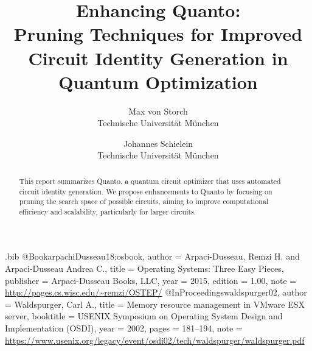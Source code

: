 \renewcommand\theadfont{\bfseries}

\usepackage{filecontents}

\begin{filecontents}{\jobname.bib}
@Book{arpachiDusseau18:osbook,
  author =       {Arpaci-Dusseau, Remzi H. and Arpaci-Dusseau Andrea C.},
  title =        {Operating Systems: Three Easy Pieces},
  publisher =    {Arpaci-Dusseau Books, LLC},
  year =         2015,
  edition =      {1.00},
  note =         {\url{http://pages.cs.wisc.edu/~remzi/OSTEP/}}
}
@InProceedings{waldspurger02,
  author =       {Waldspurger, Carl A.},
  title =        {Memory resource management in {VMware ESX} server},
  booktitle =    {USENIX Symposium on Operating System Design and
                  Implementation (OSDI)},
  year =         2002,
  pages =        {181--194},
  note =         {\url{https://www.usenix.org/legacy/event/osdi02/tech/waldspurger/waldspurger.pdf}}}
\end{filecontents}




\title{\Large \bf Enhancing Quanto:\\Pruning Techniques for Improved Circuit Identity Generation in Quantum Optimization}

\author{
{\rm Max von Storch}\\
Technische Universität München
\and
{\rm Johannes Schielein}\\
Technische Universität München
} %

\maketitle

\begin{abstract}
This report summarizes Quanto, a quantum circuit optimizer that uses automated circuit identity generation. We propose enhancements to Quanto by focusing on pruning the search space of possible circuits, aiming to improve computational efficiency and scalability, particularly for larger circuits.  
\end{abstract}


